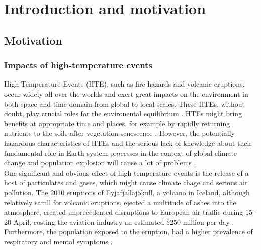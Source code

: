 \chapter{Introduction and motivation}

\label{Chapter1}

\newcommand{\keyword}[1]{\textbf{#1}}
\newcommand{\tabhead}[1]{\textbf{#1}}
\newcommand{\code}[1]{\texttt{#1}}
\newcommand{\file}[1]{\texttt{\bfseries#1}}
\newcommand{\option}[1]{\texttt{\itshape#1}}


\section{Motivation}


\subsection{Impacts of high-temperature events}

High Temperature Events (HTE), such as fire hazards and volcanic eruptions, occur widely all over the worlds and exert great impacts on the environment in both space and time domain from global to local scales. These HTEs, without doubt, play crucial roles for the environental equilibrium \parencite{Reference1}. HTEs might bring benefits at appropriate time and places, for example by rapidly returning nutrients to the soils after vegetation senescence \parencite{Reference2}. However, the potentially hazardous characteristics of HTEs and the serious lack of knowledge about their fundamental role in Earth system processes in the context of global climate change and population explosion will cause a lot of problems \parencite{Reference3}.\\

\noindent One significant and obvious effect of high-temperature events is the release of a host of particulates and gases, which might cause climate chage and serious air pollution. The 2010 eruptions of Eyjafjallajökull, a volcano in Iceland, although relatively samll for volcanic eruptions, ejected a multitude of ashes into the atmosphere, created unprecedented disruptions to European air traffic during 15 - 20 April, costing the aviation industry an estimated \$250 million per day \parencite{Reference4}. Furthermore, the population exposed to the eruption, had a higher prevalence of respiratory and mental symptoms \parencite{Reference5}.\\

